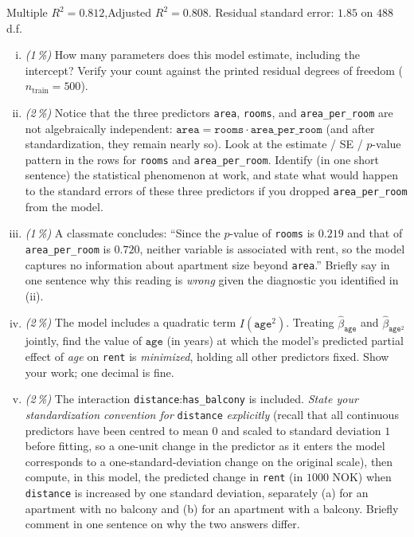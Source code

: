 \documentclass[11pt,a4paper]{article}
\newcommand{\subpoints}[1]{\textit{(#1\,\%)}}
\begin{document}
\noindent Multiple $R^2 = 0.812$,\quad Adjusted $R^2 = 0.808$.\quad
Residual standard error: $1.85$ on $488$ d.f.

\begin{enumerate}[(i)]
  \item \subpoints{1} How many parameters does this model estimate, including the intercept? Verify your count against the printed residual degrees of freedom ($n_\text{train} = 500$).
  \item \subpoints{2} Notice that the three predictors \texttt{area}, \texttt{rooms}, and \texttt{area\_per\_room} are not algebraically independent: $\texttt{area} = \texttt{rooms} \cdot \texttt{area\_per\_room}$ (and after standardization, they remain nearly so). Look at the estimate / SE / $p$-value pattern in the rows for \texttt{rooms} and \texttt{area\_per\_room}. Identify (in one short sentence) the statistical phenomenon at work, and state what would happen to the standard errors of these three predictors if you dropped \texttt{area\_per\_room} from the model.
  \item \subpoints{1} A classmate concludes: ``Since the $p$-value of \texttt{rooms} is $0.219$ and that of \texttt{area\_per\_room} is $0.720$, neither variable is associated with rent, so the model captures no information about apartment size beyond \texttt{area}.'' Briefly say in one sentence why this reading is \emph{wrong} given the diagnostic you identified in (ii).
  \item \subpoints{2} The model includes a quadratic term $I(\texttt{age}^2)$. Treating $\hat\beta_{\texttt{age}}$ and $\hat\beta_{\texttt{age}^2}$ jointly, find the value of $\texttt{age}$ (in years) at which the model's predicted partial effect of \emph{age} on \texttt{rent} is \emph{minimized}, holding all other predictors fixed. Show your work; one decimal is fine.
  \item \subpoints{2} The interaction \texttt{distance}:\texttt{has\_balcony} is included. \emph{State your standardization convention for} \texttt{distance} \emph{explicitly} (recall that all continuous predictors have been centred to mean $0$ and scaled to standard deviation $1$ before fitting, so a one-unit change in the predictor as it enters the model corresponds to a one-standard-deviation change on the original scale), then compute, in this model, the predicted change in \texttt{rent} (in $1000$ NOK) when \texttt{distance} is increased by one standard deviation, separately (a) for an apartment with no balcony and (b) for an apartment with a balcony. Briefly comment in one sentence on why the two answers differ.

\end{enumerate}
\end{document}

